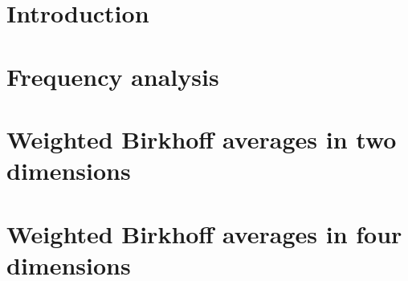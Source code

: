 


\frontmatter





\cleardoublepage
\tableofcontents
\mainmatter


\chapter{Introduction}

\chapter{Frequency analysis}


\chapter{Weighted Birkhoff averages in two dimensions}


\chapter{Weighted Birkhoff averages in four dimensions}



